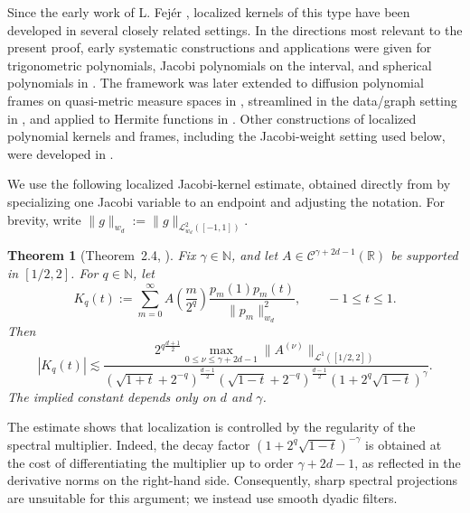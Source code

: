 \documentclass{article}
\numberwithin{equation}{section}
\newtheorem{theorem}{Theorem}
\def\NN{\mathbb{N}}
\def\RR{\mathbb{R}}
\def\mal{\max\limits}
\begin{document}
Since the early work of L. Fejér \cite{fejer1903untersuchungen}, localized kernels of this type have been developed in several closely related settings. 
In the directions most relevant to the present proof, early systematic constructions and applications were given for trigonometric polynomials, Jacobi polynomials on the interval, and spherical polynomials in 
\cite{mhaskarPrestin2005local,mhaskar2004polynomialLocal,mhaskar2005sphereLocalized}. 
The framework was later extended to diffusion polynomial frames on quasi-metric measure spaces in 
\cite{maggioniMhaskar2008diffusion}, streamlined in the data/graph setting in 
\cite{mhaskar2018unified}, and applied to Hermite functions in 
\cite{mhaskar2017hermiteLocal}. 
Other constructions of localized polynomial kernels and frames, including the Jacobi-weight setting used below, were developed in 
\cite{petrushev2005localized,ivanov2010sub}. 

We use the following localized Jacobi-kernel estimate, obtained directly from \cite[Theorem~2.4]{petrushev2005localized} by specializing one Jacobi variable to an endpoint and adjusting the notation. For brevity, write $\|g\|_{w_d}:=\|g\|_{\mathcal L^2_{w_d}([-1,1])}$.

\begin{theorem}[Theorem~2.4, \cite{petrushev2005localized}]\label{thm_petrushev_xu_localized}
Fix $\gamma\in\NN$, and let $A\in\mathcal C^{\gamma+2d-1}(\RR)$ be supported in $[1/2,2]$. 
For $q\in\NN$, let
\begin{equation*}
    K_q(t):=\sum_{m=0}^\infty 
    A\left(\frac{m}{2^q}\right)
    \frac{p_m(1)p_m(t)}{\|p_m\|_{w_d}^2},
    \qquad -1\le t\le1.
\end{equation*}
Then
\begin{equation*}
    |K_q(t)|
    \lesssim
    \frac{2^{q\frac{d+1}{2}}\mal_{0\le\nu\le\gamma+2d-1}
    \|A^{(\nu)}\|_{\mathcal L^1([1/2,2])}}
    {(\sqrt{1+t}+2^{-q})^{\frac{d-1}{2}}
     (\sqrt{1-t}+2^{-q})^{\frac{d-1}{2}}
     (1+2^q\sqrt{1-t})^\gamma}.
\end{equation*}
The implied constant depends only on $d$ and $\gamma$.
\end{theorem}

The estimate shows that localization is controlled by the regularity of the spectral multiplier. Indeed, the decay factor $(1+2^q\sqrt{1-t})^{-\gamma}$ is obtained at the cost of differentiating the multiplier up to order $\gamma+2d-1$, as reflected in the derivative norms on the right-hand side. Consequently, sharp spectral projections are unsuitable for this argument; we instead use smooth dyadic filters.
\end{document}

